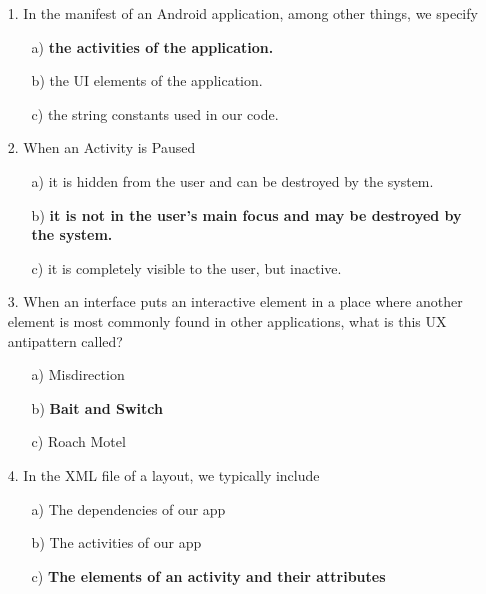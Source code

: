 \documentclass[12pt]{article}
\begin{document}
\begin{itemize}
    \item[1.] In the manifest of an Android application, among other things, we specify
    \begin{itemize}
        \item[a)] \textbf{the activities of the application.}
        \item[b)] the UI elements of the application.
        \item[c)] the string constants used in our code.
    \end{itemize}

    \item[2.] When an Activity is Paused
    \begin{itemize}
        \item[a)] it is hidden from the user and can be destroyed by the system.
        \item[b)] \textbf{it is not in the user's main focus and may be destroyed by the system.}
        \item[c)] it is completely visible to the user, but inactive.
    \end{itemize} 

    \item[3.] When an interface puts an interactive element in a place where another element is most commonly found in other applications, what is this UX antipattern called?
    \begin{itemize}
        \item[a)] Misdirection
        \item[b)] \textbf{Bait and Switch}
        \item[c)] Roach Motel
    \end{itemize} 

    \item[4.] In the XML file of a layout, we typically include
    \begin{itemize}
        \item[a)] The dependencies of our app
        \item[b)] The activities of our app
        \item[c)] \textbf{The elements of an activity and their attributes}
    \end{itemize} 


\end{itemize}
\end{document}
